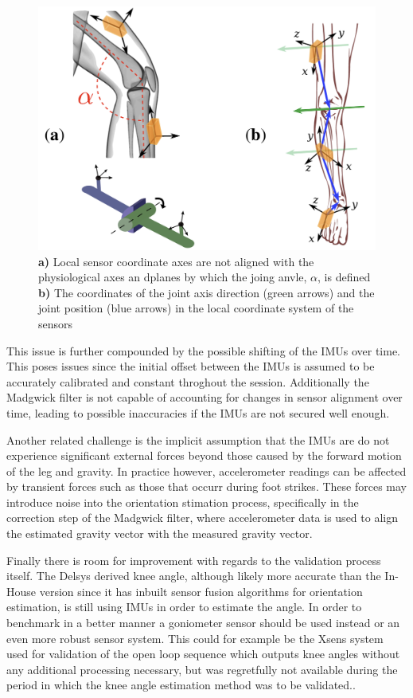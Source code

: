 \begin{figure}
    \centering
    \includegraphics[width=0.75\linewidth]{images/kneeOrientation.png}
    \caption{\textbf{a)} Local sensor coordinate axes are not aligned with the physiological axes an dplanes by which the joing anvle, \(\alpha\), is defined \textbf{b)} The coordinates of the joint axis direction (green arrows) and the joint position (blue arrows) in the local coordinate system of the sensors \cite{seel_imu-based_2014}}
    \label{fig:enter-label}
\end{figure}

This issue is further compounded by the possible shifting of the IMUs over time. This poses issues since the initial offset between the IMUs is assumed to be accurately calibrated and constant throghout the session. Additionally the Madgwick filter is not capable of accounting for changes in sensor alignment over time, leading to possible inaccuracies if the IMUs are not secured well enough.

Another related challenge is the implicit assumption that the IMUs are do not experience significant external forces beyond those caused by the forward motion of the leg and gravity. In practice however, accelerometer readings can be affected by transient forces such as those that occurr during foot strikes. These forces may introduce noise into the orientation stimation process, specifically in the correction step of the Madgwick filter, where accelerometer data is used to align the estimated gravity vector with the measured gravity vector.

Finally there is room for improvement with regards to the validation process itself. The Delsys derived knee angle, although likely more accurate than the In-House version since it has inbuilt sensor fusion algorithms for orientation estimation, is still using IMUs in order to estimate the angle. In order to benchmark in a better manner a goniometer sensor should be used instead or an even more robust sensor system. This could for example be the Xsens system used for validation of the open loop sequence which outputs knee angles without any additional processing necessary, but was regretfully not available during the period in which the knee angle estimation method was to be validated.. 

